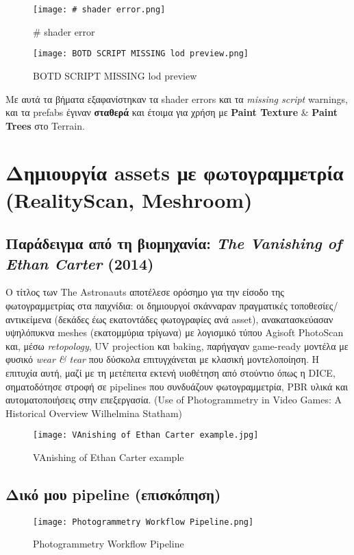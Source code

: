 \begin{figure}[H]
    \centering
    \texttt{[image: \# shader error.png]}
    \caption{# shader error}
    \label{fig:placeholder}
\end{figure}
\begin{figure}[H]
    \centering
    \texttt{[image: BOTD SCRIPT MISSING lod preview.png]}
    \caption{BOTD SCRIPT MISSING lod preview}
    \label{fig:placeholder}
\end{figure}

 Με αυτά τα βήματα εξαφανίστηκαν τα shader errors και τα \emph{missing script} warnings, και τα prefabs έγιναν \textbf{σταθερά} και έτοιμα για χρήση με \textbf{Paint Texture} \& \textbf{Paint Trees} στο Terrain.


\section{Δημιουργία assets με φωτογραμμετρία (RealityScan, Meshroom)}
\subsection*{Παράδειγμα από τη βιομηχανία: \emph{The Vanishing of Ethan Carter} (2014)}
Ο τίτλος των The Astronauts αποτέλεσε ορόσημο για την είσοδο της φωτογραμμετρίας στα παιχνίδια: οι δημιουργοί σκάνναραν πραγματικές τοποθεσίες/αντικείμενα (δεκάδες έως εκατοντάδες φωτογραφίες ανά asset), ανακατασκεύασαν υψηλόπυκνα meshes (εκατομμύρια τρίγωνα) με λογισμικό τύπου Agisoft PhotoScan και, μέσω \emph{retopology}, UV projection και baking, παρήγαγαν game-ready μοντέλα με φυσικό \emph{wear \& tear} που δύσκολα επιτυγχάνεται με κλασική μοντελοποίηση. Η επιτυχία αυτή, μαζί με τη μετέπειτα εκτενή υιοθέτηση από στούντιο όπως η DICE, σηματοδότησε στροφή σε pipelines που συνδυάζουν φωτογραμμετρία, PBR υλικά και αυτοματοποιήσεις στην επεξεργασία. (Use of Photogrammetry in Video Games: A Historical Overview Wilhelmina Statham)
\begin{figure}[H]
    \centering
    \texttt{[image: VAnishing of Ethan Carter example.jpg]}
    \caption{VAnishing of Ethan Carter example}
    \label{fig:placeholder}
\end{figure}

\subsection*{Δικό μου pipeline (επισκόπηση)}
\begin{figure}[H]
    \centering
    \texttt{[image: Photogrammetry Workflow Pipeline.png]}
    \caption{Photogrammetry Workflow Pipeline}
    \label{fig:placeholder}
\end{figure}

